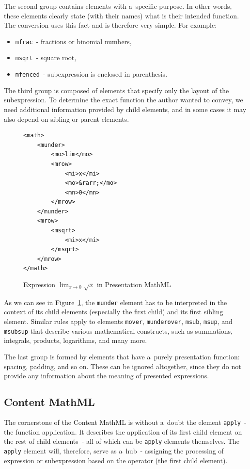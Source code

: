 \documentclass[11pt,oneside,final]{fithesis2}
\begin{document}
The second group contains elements with a~specific purpose. In other words, these elements clearly state (with their names) what is their intended function. The conversion uses this fact and is therefore very simple. For example:
\begin{itemize}
\item \texttt{mfrac}~- fractions or binomial numbers,
\item \texttt{msqrt}~- square root,
\item \texttt{mfenced}~- subexpression is enclosed in parenthesis.
\end{itemize}

The third group is composed of elements that specify only the layout of the subexpression. To determine the exact function the author wanted to convey, we need additional information provided by child elements, and in some cases it may also depend on sibling or parent elements. 
\begin{figure}[!ht]
\lstset{language=XML,frame=lines}
\begin{lstlisting}
<math>
	<munder>
		<mo>lim</mo>
		<mrow>
			<mi>x</mi>
			<mo>&rarr;</mo>
			<mn>0</mn>
		</mrow>		
	</munder>
	<mrow>
		<msqrt>
			<mi>x</mi>
		</msqrt>
	</mrow>
</math>
\end{lstlisting}
\caption{Expression $\lim_{x \to 0}\sqrt{x}$ in Presentation MathML}
\label{fig:mathmllimit}
\end{figure}

As we can see in Figure~\ref{fig:mathmllimit}, the \texttt{munder} element has to be interpreted in the context of its child elements (especially the first child) and its first sibling element. Similar rules apply to elements \texttt{mover}, \texttt{munderover}, \texttt{msub}, \texttt{msup}, and \texttt{msubsup} that describe various mathematical constructs, such as summations, integrals, products, logarithms, and many more.

The last group is formed by elements that have a~purely presentation function: spacing, padding, and so on. These can be ignored altogether, since they do not provide any information about the meaning of presented expressions.


\subsection{Content MathML}
\label{section:analysis-content}
The cornerstone of the Content MathML is without a~doubt the element \texttt{apply}~- the function application. It describes the application of its first child element on the rest of child elements~- all of which can be \texttt{apply} elements themselves. The \texttt{apply} element will, therefore, serve as a~hub~- assigning the processing of expression or subexpression based on the operator (the first child element).
\end{document}

